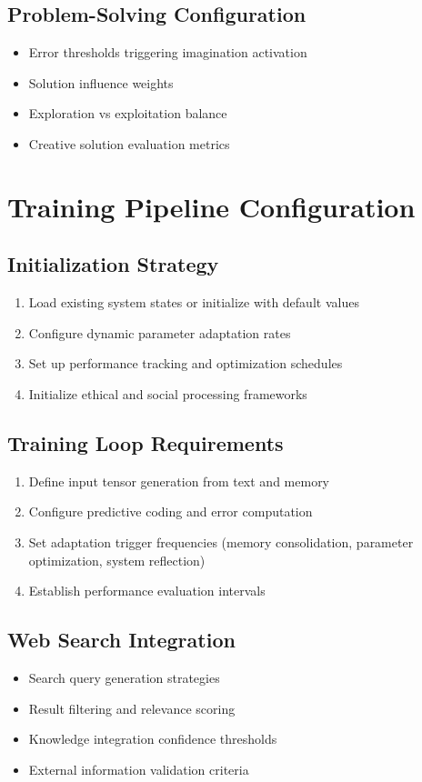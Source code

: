 \documentclass[11pt,a4paper]{article}
\begin{document}
\subsection{Problem-Solving Configuration}
\begin{itemize}[leftmargin=0.5in]
    \item Error thresholds triggering imagination activation
    \item Solution influence weights
    \item Exploration vs exploitation balance
    \item Creative solution evaluation metrics
\end{itemize}

\section{Training Pipeline Configuration}

\subsection{Initialization Strategy}
\begin{enumerate}
    \item Load existing system states or initialize with default values
    \item Configure dynamic parameter adaptation rates
    \item Set up performance tracking and optimization schedules
    \item Initialize ethical and social processing frameworks
\end{enumerate}

\subsection{Training Loop Requirements}
\begin{enumerate}
    \item Define input tensor generation from text and memory
    \item Configure predictive coding and error computation
    \item Set adaptation trigger frequencies (memory consolidation, 
    parameter optimization, system reflection)
    \item Establish performance evaluation intervals
\end{enumerate}

\subsection{Web Search Integration}
\begin{itemize}[leftmargin=0.5in]
    \item Search query generation strategies
    \item Result filtering and relevance scoring
    \item Knowledge integration confidence thresholds
    \item External information validation criteria
\end{itemize}
\end{document}

